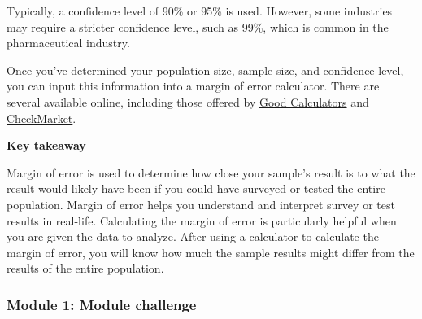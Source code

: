 \documentclass[]{article}
\begin{document}
Typically, a confidence level of 90\% or 95\% is used. However, some industries may require a stricter confidence level, such as 99\%, which is common in the pharmaceutical industry.

Once you've determined your population size, sample size, and confidence level, you can input this information into a margin of error calculator. There are several available online, including those offered by \href{https://goodcalculators.com/margin-of-error-calculator/}{Good Calculators} and \href{https://www.checkmarket.com/sample-size-calculator/#sample-size-margin-of-error-calculator}{CheckMarket}.

\textbf{Key takeaway}

Margin of error is used to determine how close your sample’s result is to what the result would likely have been if you could have surveyed or tested the entire population. Margin of error helps you understand and interpret survey or test results in real-life.  Calculating the margin of error is particularly helpful when you are given the data to analyze. After using a calculator to calculate the margin of error, you will know how much the sample results might differ from the results of the entire population.

\subsubsection{Module 1: Module challenge}
\end{document}
